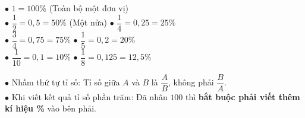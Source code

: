 \documentclass[14pt,a4paper,oneside]{extbook}
\begin{document}
\vspace{3mm}

\noindent
\begin{minipage}[t]{0.54\textwidth}
  \begin{tcolorbox}[
    enhanced,
    title={\footnotesize\bfseries\color{white}\faBolt\ Các mốc phần trăm vàng cần thuộc lòng},
    colback=green!3!white,
    colframe=green!60!black,
    arc=2.5mm, boxrule=0.8pt, top=1.8mm, bottom=1.8mm, left=2.2mm, right=2.2mm
  ]
    \footnotesize
    $\bullet$ $1 = 100\%$ (Toàn bộ một đơn vị)\\
    $\bullet$ $\dfrac{1}{2} = 0,5 = 50\%$ (Một nửa) \quad $\bullet$ $\dfrac{1}{4} = 0,25 = 25\%$\\
    $\bullet$ $\dfrac{3}{4} = 0,75 = 75\%$ \qquad $\bullet$ $\dfrac{1}{5} = 0,2 = 20\%$\\
    $\bullet$ $\dfrac{1}{10} = 0,1 = 10\%$ \qquad $\bullet$ $\dfrac{1}{8} = 0,125 = 12,5\%$
  \end{tcolorbox}
\end{minipage}%
\hfill
\begin{minipage}[t]{0.44\textwidth}
  \begin{tcolorbox}[
    enhanced,
    title={\footnotesize\bfseries\color{white}\faExclamationTriangle\ Mẹo tránh bẫy trắc nghiệm},
    colback=red!2!white,
    colframe=red!70!black,
    arc=2.5mm, boxrule=0.8pt, top=1.8mm, bottom=1.8mm, left=2.2mm, right=2.2mm
  ]
    \footnotesize
    $\bullet$ Nhầm thứ tự tỉ số: Tỉ số giữa $A$ và $B$ là $\dfrac{A}{B}$, không phải $\dfrac{B}{A}$.\\
    $\bullet$ Khi viết kết quả tỉ số phần trăm: Đã nhân $100$ thì \textbf{bắt buộc phải viết thêm kí hiệu \%} vào bên phải.
  \end{tcolorbox}
\end{minipage}
\end{document}
